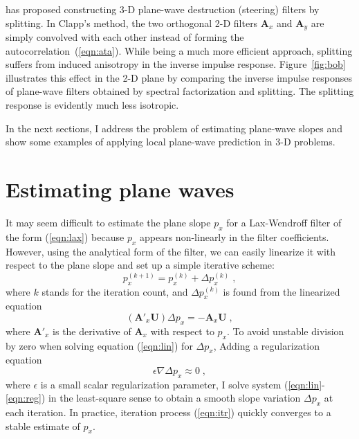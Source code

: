 
\cite{Clapp.sep.105.bob2} has proposed constructing 3-D plane-wave
destruction (steering) filters by splitting. In Clapp's method, the
two orthogonal 2-D filters $\mathbf{A}_x$ and $\mathbf{A}_y$ are
simply convolved with each other instead of forming the
autocorrelation~(\ref{eqn:ata}). While being a much more efficient
approach, splitting suffers from induced anisotropy in the inverse
impulse response. Figure~\ref{fig:bob} illustrates this effect in the
2-D plane by comparing the inverse impulse responses of plane-wave
filters obtained by spectral factorization and splitting.  The
splitting response is evidently much less isotropic.


\par
In the next sections, I address the problem of estimating plane-wave
slopes and show some examples of applying local plane-wave prediction
in 3-D problems.

\section{Estimating plane waves}

It may seem difficult to estimate the plane slope $p_x$ for a
Lax-Wendroff filter of the form (\ref{eqn:lax}) because $p_x$ appears
non-linearly in the filter coefficients. However, using the analytical
form of the filter, we can easily linearize it with respect to the
plane slope and set up a simple iterative scheme: 
\begin{equation}
  \label{eqn:itr}
  p_x^{(k+1)} = p_x^{(k)} + \Delta  p_x^{(k)}\;,
\end{equation}
where $k$ stands for the iteration count, and  $\Delta  p_x^{(k)}$ is found
from the linearized equation
\begin{equation}
  \label{eqn:lin}
\left(\mathbf{A'}_x \mathbf{U}\right) \Delta  p_x = - 
\mathbf{A}_x \mathbf{U}\;,
\end{equation}
where $\mathbf{A'}_x$ is the derivative of $\mathbf{A}_x$ with respect to
$p_x$. To avoid unstable division by zero when solving equation
(\ref{eqn:lin}) for $\Delta p_x$, Adding a regularization equation
\begin{equation}
  \label{eqn:reg}
\epsilon \nabla \Delta  p_x \approx 0\;,
\end{equation}
where $\epsilon$ is a small scalar regularization parameter, I solve
system (\ref{eqn:lin}-\ref{eqn:reg}) in the least-square sense to
obtain a smooth slope variation $\Delta p_x$ at each iteration.  In
practice, iteration process (\ref{eqn:itr}) quickly converges to a
stable estimate of $p_x$.
